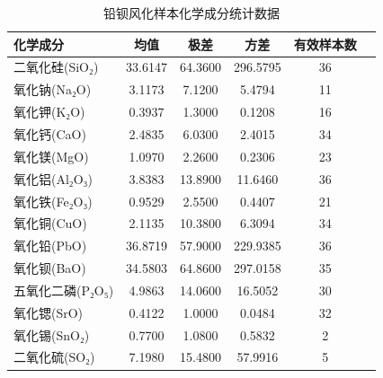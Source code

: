\documentclass[withoutpreface,bwprint]{cumcmthesis}
\begin{document}
\begin{table}[htbp]
    \centering
    \caption{铅钡风化样本化学成分统计数据}
    \begin{tabular}{lccccc}
        \hline
        化学成分 & 均值 & 极差 & 方差 & 有效样本数 \\
        \hline
        二氧化硅(SiO₂) & 33.6147 & 64.3600 & 296.5795 & 36 \\
        氧化钠(Na₂O) & 3.1173 & 7.1200 & 5.4794 & 11 \\
        氧化钾(K₂O) & 0.3937 & 1.3000 & 0.1208 & 16 \\
        氧化钙(CaO) & 2.4835 & 6.0300 & 2.4015 & 34 \\
        氧化镁(MgO) & 1.0970 & 2.2600 & 0.2306 & 23 \\
        氧化铝(Al₂O₃) & 3.8383 & 13.8900 & 11.6460 & 36 \\
        氧化铁(Fe₂O₃) & 0.9529 & 2.5500 & 0.4407 & 21 \\
        氧化铜(CuO) & 2.1135 & 10.3800 & 6.3094 & 34 \\
        氧化铅(PbO) & 36.8719 & 57.9000 & 229.9385 & 36 \\
        氧化钡(BaO) & 34.5803 & 64.8600 & 297.0158 & 35 \\
        五氧化二磷(P₂O₅) & 4.9863 & 14.0600 & 16.5052 & 30 \\
        氧化锶(SrO) & 0.4122 & 1.0000 & 0.0484 & 32 \\
        氧化锡(SnO₂) & 0.7700 & 1.0800 & 0.5832 & 2 \\
        二氧化硫(SO₂) & 7.1980 & 15.4800 & 57.9916 & 5 \\
        \hline
    \end{tabular}
\end{table}
\end{document}
